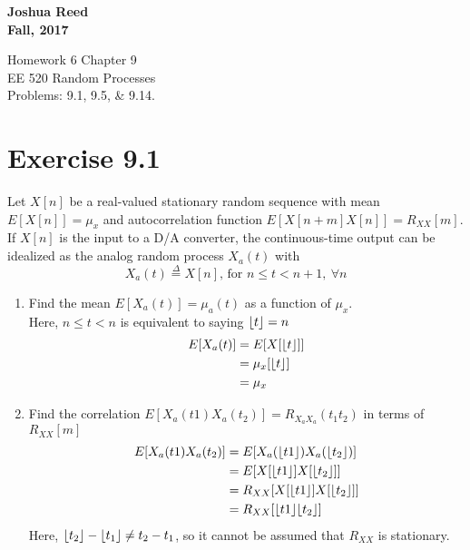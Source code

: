 \documentclass[12pt]{article}
\newcommand{\mysection}[1]{\section*{#1}}
\DeclarePairedDelimiter\floor{\lfloor}{\rfloor}
\begin{document}
{\large \bfseries %
  Joshua Reed\\
  Fall, 2017
  \begin{center}
    {\huge  Homework 6 Chapter 9} \\
    {EE 520} Random Processes \\
    \normalsize Problems: 9.1, 9.5, \& 9.14.
  \end{center}}
 
 
\mysection{Exercise 9.1} 
Let $X[n]$ be a real-valued stationary random sequence with mean $E[X[n]]=\mu_x$
and autocorrelation function $E[X[n+m]X[n]]=R_{XX}[m]$. If $X[n]$ is the 
input to a D/A converter, the continuous-time output can be idealized as the 
analog random process $X_a(t)$ with 
\[ X_a(t)\stackrel{\Delta }{=}X[n]\text{, for  }n\leq t<n+1,\ \forall n \]

\begin{enumerate}[label= (\alph*)]
  \item Find the mean $E[X_a(t)]=\mu_a(t)$ as a function of $\mu_x$.\\
    Here, $n\leq t < n$ is equivalent to saying $\floor{t}=n$
    \begin{align*}
      E[X_a(t)]&=E[X[\floor{t}]]\\
               &=\mu_x[\floor{t}]\\
               &=\mu_x
    \end{align*}
  \item Find the correlation $E[X_a(t1)X_a(t_2)]=R_{X_a X_a}(t_1t_2)$ in terms of $R_{XX}[m]$ 
    \begin{align*}
      E[X_a(t1)X_a(t_2)]&=E[X_a(\floor{t1})X_a(\floor{t_2})]\\
                        &=E[X[\floor{t1}]X[\floor{t_2}]]\\
                        &=R_{XX}[X[\floor{t1}]X[\floor{t_2}]]\\
                        &=R_{XX}[\floor{t1}\floor{t_2}]\\
    \end{align*}
    Here, $\floor{t_2}-\floor{t_1}\neq t_2-t_1$, so it cannot be assumed that $R_{XX}$ is stationary.
\end{enumerate}

\newpage
\end{document}
